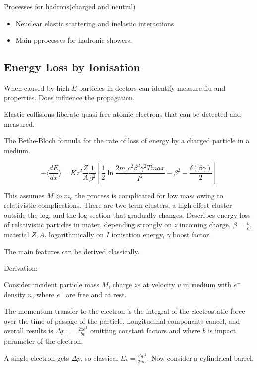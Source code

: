 \documentclass[]{article}
\begin{document}
		Processes for hadrons(charged and neutral)
		\begin{itemize}
			\item Neuclear elastic scattering and inelastic interactions
			\item Main pprocesses for hadronic showers.
		\end{itemize}
		
	\subsection{Energy Loss by Ionisation}
	
	When caused by high $E$ particles in dectors can identify measure flu and properties. Does influence the propagation. 
	
	Elastic collisions liberate quasi-free atomic electrons that can be detected and measured.
	
	The Bethe-Bloch formula for the rate of loss of energy by a charged particle in a medium.
	
	\begin{equation}
	-\langle\frac{dE}{dx}\rangle = Kz^2\frac{Z}{A}\frac{1}{\beta^2}[\frac{1}{2}\ln\frac{2m_ec^2\beta^2\gamma^2Tmax}{I^2} - \beta^2 - \frac{\delta(\beta\gamma)}{2}]
	\end{equation}
	
	This assumes $M \gg m_e$ the process is complicated for low mass owing to relativistic complications. There are two term clusters, a high effect cluster outside the log, and the log section that gradually changes. Describes energy loss of relativistic particles in mater, depending strongly on $z$ incoming charge, $\beta = \frac{v}{c}$, material $Z, A$. logarithmically on $I$ ionisation energy, $\gamma$ boost factor.
	
	The main features can be derived classically.
	
	Derivation:
	
	Consider incident particle mass $M$, charge $ze$ at velocity $v$ in medium with $e^-$ density $n$, where $e^-$ are free and at rest.
	
	The momentum transfer to the electron is the integral of the electrostatic force over the time of passage of the particle. Longitudinal components cancel, and overall results is $\Delta p_\perp = \frac{2ze^2}{bv}$ omitting constant factors and where $b$ is impact parameter of the electron.
	
	A single electron gets $\Delta p$, so classical $E_k = \frac{\Delta p^2}{2m_e}$. Now consider a cylindrical barrel. 
	
\end{document}
